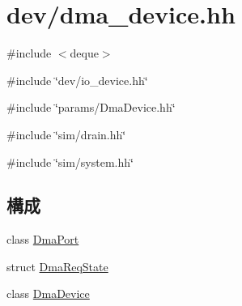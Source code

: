 \hypertarget{dma__device_8hh}{
\section{dev/dma\_\-device.hh}
\label{dma__device_8hh}
}
{\ttfamily \#include $<$deque$>$}\par
{\ttfamily \#include \char`\"{}dev/io\_\-device.hh\char`\"{}}\par
{\ttfamily \#include \char`\"{}params/DmaDevice.hh\char`\"{}}\par
{\ttfamily \#include \char`\"{}sim/drain.hh\char`\"{}}\par
{\ttfamily \#include \char`\"{}sim/system.hh\char`\"{}}\par
\subsection*{構成}
\begin{DoxyCompactItemize}
\item 
class \hyperlink{classDmaPort}{DmaPort}
\item 
struct \hyperlink{structDmaPort_1_1DmaReqState}{DmaReqState}
\item 
class \hyperlink{classDmaDevice}{DmaDevice}
\end{DoxyCompactItemize}
